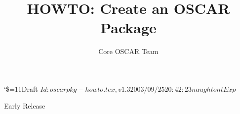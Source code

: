 \documentclass[letterpaper]{article}
\title{HOWTO: Create an OSCAR Package}
\author{Core OSCAR Team}
\begin{document}
\maketitle

\begin{center}
  {\catcode`\$=11\tiny\noindent Draft $Id: oscarpkg-howto.tex,v 1.3 2003/09/25 20:42:23 naughtont Exp $}

  \begin{large}Early Release\end{large}
\end{center}














%
%
\appendix





%


%
\end{document}
